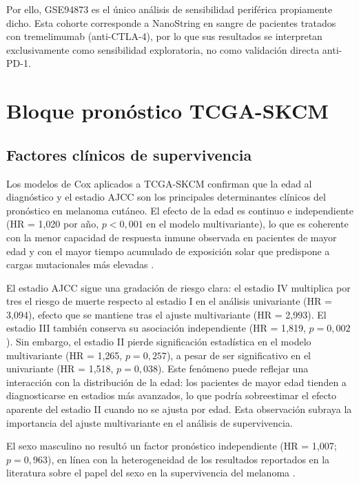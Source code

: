 Por ello, GSE94873 es el único análisis de sensibilidad periférica propiamente dicho. Esta cohorte corresponde a NanoString en sangre de pacientes tratados con tremelimumab (anti-CTLA-4), por lo que sus resultados se interpretan exclusivamente como sensibilidad exploratoria, no como validación directa anti-PD-1.

\section{Bloque pronóstico TCGA-SKCM}

\subsection{Factores clínicos de supervivencia}

Los modelos de Cox aplicados a TCGA-SKCM confirman que la edad al diagnóstico y el estadio AJCC son los principales determinantes clínicos del pronóstico en melanoma cutáneo. El efecto de la edad es continuo e independiente (HR = 1{,}020 por año, $p < 0{,}001$ en el modelo multivariante), lo que es coherente con la menor capacidad de respuesta inmune observada en pacientes de mayor edad y con el mayor tiempo acumulado de exposición solar que predispone a cargas mutacionales más elevadas \cite{Podlipnik2021}.

El estadio AJCC sigue una gradación de riesgo clara: el estadio IV multiplica por tres el riesgo de muerte respecto al estadio I en el análisis univariante (HR = 3{,}094), efecto que se mantiene tras el ajuste multivariante (HR = 2{,}993). El estadio III también conserva su asociación independiente (HR = 1{,}819, $p = 0{,}002$). Sin embargo, el estadio II pierde significación estadística en el modelo multivariante (HR = 1{,}265, $p = 0{,}257$), a pesar de ser significativo en el univariante (HR = 1{,}518, $p = 0{,}038$). Este fenómeno puede reflejar una interacción con la distribución de la edad: los pacientes de mayor edad tienden a diagnosticarse en estadios más avanzados, lo que podría sobreestimar el efecto aparente del estadio II cuando no se ajusta por edad. Esta observación subraya la importancia del ajuste multivariante en el análisis de supervivencia.

El sexo masculino no resultó un factor pronóstico independiente (HR = 1{,}007; $p = 0{,}963$), en línea con la heterogeneidad de los resultados reportados en la literatura sobre el papel del sexo en la supervivencia del melanoma \cite{Bastian2014}.

